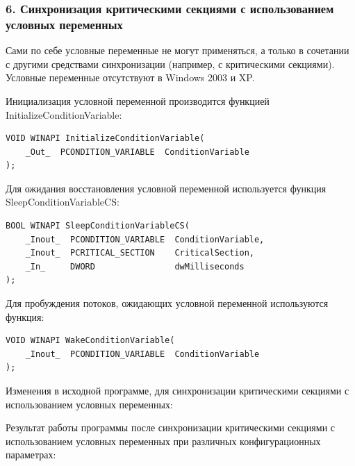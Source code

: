 \documentclass[14pt,a4paper,report]{report}
\begin{document}
\subsubsection{6. Синхронизация критическими секциями с использованием условных переменных}

Сами по себе условные переменные не могут применяться, а только в сочетании с другими средствами синхронизации (например, с критическими секциями). Условные переменные отсутствуют в Windows 2003 и XP. 

Инициализация условной переменной производится функцией InitializeConditionVariable:

\begin{verbatim}
VOID WINAPI InitializeConditionVariable(
    _Out_  PCONDITION_VARIABLE  ConditionVariable
);
\end{verbatim}

Для ожидания восстановления условной переменной используется функция SleepConditionVariableCS:

\begin{verbatim}
BOOL WINAPI SleepConditionVariableCS(
    _Inout_  PCONDITION_VARIABLE  ConditionVariable,
    _Inout_  PCRITICAL_SECTION    CriticalSection,
    _In_     DWORD                dwMilliseconds
);
\end{verbatim}

Для пробуждения потоков, ожидающих условной переменной используются функция:

\begin{verbatim}
VOID WINAPI WakeConditionVariable(
    _Inout_  PCONDITION_VARIABLE  ConditionVariable
);
\end{verbatim}

Изменения в исходной программе, для синхронизации критическими секциями с использованием условных переменных:



Результат работы программы после синхронизации  критическими секциями с использованием условных переменных при различных конфигурационных параметрах:
\end{document}
